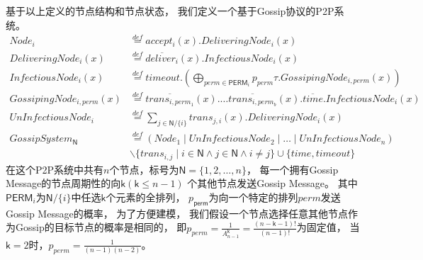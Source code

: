 基于以上定义的节点结构和节点状态，
我们定义一个基于Gossip协议的P2P系统。
\begin{equation}
   \begin{split}
   Node_i& \stackrel{def}{=} accept_i(x).DeliveringNode_i(x)\\
   DeliveringNode_i(x) &\stackrel{def}{=} \overline{deliver_i}(x).InfectiousNode_i(x)\\
   InfectiousNode_i(x)&\stackrel{def}{=}timeout.(\bigoplus_{perm\in \mathsf{PERM}_i} p_{perm}\tau.GossipingNode_{i,perm}(x))\\
   GossipingNode_{i,perm}(x)&\stackrel{def}{=}\overline{trans_{i,perm_{1}}}(x).\dots \overline{trans_{i,perm_{b}}}(x).\overline{time}.InfectiousNode_i(x)\\
   UnInfectiousNode_i &\stackrel{def}{=} \sum_{j\in \mathsf{N}/\{i\}}trans_{j,i}(x).DeliveringNode_i(x)\\
   GossipSystem_\mathsf{N}&\stackrel{def}{=}(Node_1\mid UnInfectiousNode_2\mid \dots \mid UnInfectiousNode_n)\\
   &\backslash \{trans_{i,j}\mid i\in \mathsf{N} \wedge j\in \mathsf{N} \wedge i\neq j\}\cup \{time, timeout\}
   \end{split}
\end{equation}
在这个P2P系统中共有$n$个节点，标号为$\mathsf{N}=\{1,2,\dots, n\}$，
每一个拥有Gossip Message的节点周期性的向$\mathsf{k}(\mathsf{k}\leq n-1)$
个其他节点发送Gossip Message。
其中$\mathsf{PERM}_i$为$\mathsf{N}/\{i\}$中任选$\mathsf{k}$个元素的全排列，
$p_{\mathsf{perm}}$为向一个特定的排列$perm$发送Gossip Message的概率，
为了方便建模，
我们假设一个节点选择任意其他节点作为Gossip的目标节点的概率是相同的，
即$p_{perm} = \frac{1}{A_{n-1}^{\mathsf{k}}} = \frac{(n-\mathsf{k}-1)!}{(n-1)!}$为固定值，
当$\mathsf{k}=2$时，$p_{perm} = \frac{1}{(n-1)(n-2)}$。

